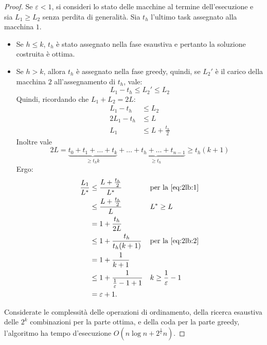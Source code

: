 \begin{proof}
	Se $\varepsilon<1$, si consideri lo stato delle macchine al termine dell'esecuzione e sia $L_1\geq L_2$ senza perdita di generalità.
	Sia $t_h$ l'ultimo task assegnato alla macchina $1$.
	\begin{itemize}
		\item Se $h\leq k$, $t_h$ è stato assegnato nella fase esaustiva e pertanto la soluzione costruita è ottima.
		\item Se $h>k$, allora $t_h$ è assegnato nella fase greedy, quindi, se $L_2'$ è il carico della macchina $2$ all'assegnamento di $t_h$, vale:
		      \begin{equation}\label{eq:2lb:1}
			      L_1-t_h\leq L_2'\leq L_2
		      \end{equation}
		      Quindi, ricordando che $L_1+L_2=2L$:
		      \begin{align}
			      L_1-t_h  & \leq L_2 \nonumber                    \\
			      2L_1-t_h & \leq L \nonumber                      \\
			      L_1      & \leq L+\frac{t_h}{2} \label{eq:2lb:2}
		      \end{align}
		      Inoltre vale
		      \begin{equation*}
			      2L = \underbrace{t_0+t_1+\dots+t_k}_{\geq t_hk}+\underbrace{\dots+t_h+\dots+t_{n-1}}_{\geq t_h} \geq t_h(k+1)
		      \end{equation*}
		      Ergo:
		      \begin{align*}
			      \frac{L_1}{L\star} & \leq \frac{L+\frac{t_h}{2}}{L\star}        &  & \text{per la \ref{eq:2lb:1}} \\
			                         & \leq \frac{L+\frac{t_h}{2}}{L}             &  & L\star\geq L                 \\
			                         & = 1+\frac{t_h}{2L}                                                           \\
			                         & \leq 1+\frac{t_h}{t_h(k+1)}                &  & \text{per la \ref{eq:2lb:2}} \\
			                         & = 1+\frac{1}{k+1}                                                            \\
			                         & \leq 1+\frac{1}{\frac{1}{\varepsilon}-1+1} &  & k\geq\frac{1}{\varepsilon}-1 \\
			                         & = \varepsilon+1 \text.
		      \end{align*}
	\end{itemize}
	Considerate le complessità delle operazioni di ordinamento, della ricerca esaustiva delle $2^k$ combinazioni per la parte ottima, e della coda per la parte greedy, l'algoritmo ha tempo d'esecuzione $O(n\log n+2^{\frac{1}{\epsilon}}n)$.
\end{proof}



